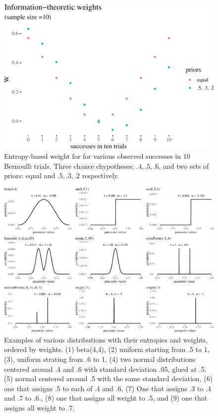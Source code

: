 \documentclass[
  10pt,
  dvipsnames,enabledeprecatedfontcommands]{scrartcl}
\begin{document}
\begin{figure}

\begin{center}\includegraphics[width=0.7\linewidth]{paper-outline_files/figure-latex/entropyJoyceExamplePlot10-1} \end{center}

\caption{Entropy-based weight for for various observed successes in 10 Bernoulli trials. Three chance chypotheses: $.4, .5, .6$, and two sets of priors: equal and $.5, .3, .2$ respectively.}
\label{fig:entropyJoyceExamplePlot}
\end{figure}

\begin{figure}[H]

\begin{center}\includegraphics[width=1\linewidth]{paper-outline_files/figure-latex/fig:weightsWeird-1} \end{center}
\caption{Examples of various distributions with their entropies and weights, ordered by weights. (1) beta(4,4), (2) uniform starting from .5 to 1, (3), uniform strating from .6 to 1, (4) two normal distributions centered around .4 and .6 with standard deviation .05, glued at .5. (5) normal centered around .5 with the same standard deviation, (6) one that assigns .5 to each of .4  and .6, (7) One that assigns .3 to .4 and .7 to .6., (8) one that assigns all weight to .5, and (9) one that assigns all weight to .7.}

\label{fig:weightsWeird}
\end{figure}
\end{document}
